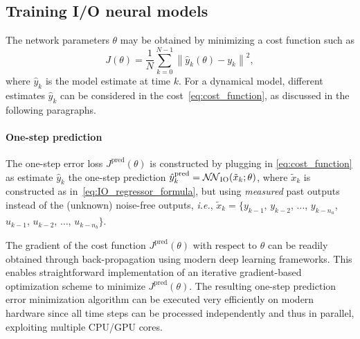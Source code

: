 \documentclass{article}
\newcommand{\NN}{\mathcal{N\!N}} %
\newcommand{\nsamp}{N}
\newcommand{\norm}[1]{\left\lVert#1\right\rVert}
\begin{document}
\subsection{Training I/O neural models}
\label{sec:training_IO}
The network parameters $\theta$ may be obtained by minimizing a cost function such as 
\begin{equation}
\label{eq:cost_function}
J(\theta) = \frac{1}{\nsamp} \sum_{k=0}^{N-1} \norm{\hat y_{k}(\theta) -   y_k}^2,
\end{equation}
where $\hat y_k$ is the model estimate at time $k$. 
For a dynamical model, different  estimates $\hat y_k$ can be considered in the cost~\eqref{eq:cost_function}, as discussed in the following paragraphs.

\paragraph{One-step prediction}
 The one-step  error loss $J^\mathrm{pred}(\theta)$ is constructed by plugging in \eqref{eq:cost_function} as estimate $\hat y_k$ the one-step prediction
$\hat y_{k}^{\mathrm{pred}} = \NN_{\rm IO}(\tilde x_{k}; \theta)$,
where $\tilde x_k$ is constructed as in~\eqref{eq:IO_regressor_formula}, but using \emph{measured} past outputs instead of the (unknown) noise-free outputs, \emph{i.e.}, $\tilde x_k = \{y_{k-1}$,  $y_{k-2}$, $\dots$, $y_{k-n_a}$, $u_{k-1}$, $u_{k-2}$, $\dots$, $u_{k-n_b} \}$.

The gradient of the cost function $J^\mathrm{pred}(\theta)$ with respect to $\theta$ can be readily obtained through back-propagation using modern deep learning frameworks.
This enables straightforward implementation of an iterative gradient-based optimization scheme to minimize $J^\mathrm{pred}(\theta)$.
The resulting one-step prediction error minimization algorithm can be  executed very efficiently on modern hardware since all time steps can be processed independently and thus in parallel, exploiting multiple CPU/GPU cores.  
\end{document}
